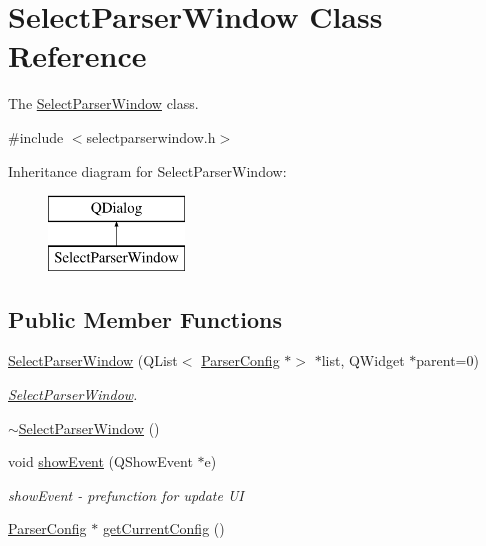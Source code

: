 \hypertarget{class_select_parser_window}{}\section{Select\+Parser\+Window Class Reference}
\label{class_select_parser_window}


The \hyperlink{class_select_parser_window}{Select\+Parser\+Window} class.  




{\ttfamily \#include $<$selectparserwindow.\+h$>$}

Inheritance diagram for Select\+Parser\+Window\+:\begin{figure}[H]
\begin{center}
\leavevmode
\includegraphics[height=2.000000cm]{class_select_parser_window}
\end{center}
\end{figure}
\subsection*{Public Member Functions}
\begin{DoxyCompactItemize}
\item 
\hyperlink{class_select_parser_window_a8d16e81dd47f921fae24e502c5394944}{Select\+Parser\+Window} (Q\+List$<$ \hyperlink{class_parser_config}{Parser\+Config} $\ast$$>$ $\ast$list, Q\+Widget $\ast$parent=0)
\begin{DoxyCompactList}\small\item\em \hyperlink{class_select_parser_window}{Select\+Parser\+Window}. \end{DoxyCompactList}\item 
\hyperlink{class_select_parser_window_ab4e0f7c430edbbfd05ed21e8f9737db9}{$\sim$\+Select\+Parser\+Window} ()
\item 
void \hyperlink{class_select_parser_window_a6adc7dff83529e4770d8b54ad13edeb7}{show\+Event} (Q\+Show\+Event $\ast$e)
\begin{DoxyCompactList}\small\item\em show\+Event -\/ prefunction for update UI \end{DoxyCompactList}\item 
\hyperlink{class_parser_config}{Parser\+Config} $\ast$ \hyperlink{class_select_parser_window_ab6397caf6e7270309a5b57befb3f144f}{get\+Current\+Config} ()
\end{DoxyCompactItemize}


